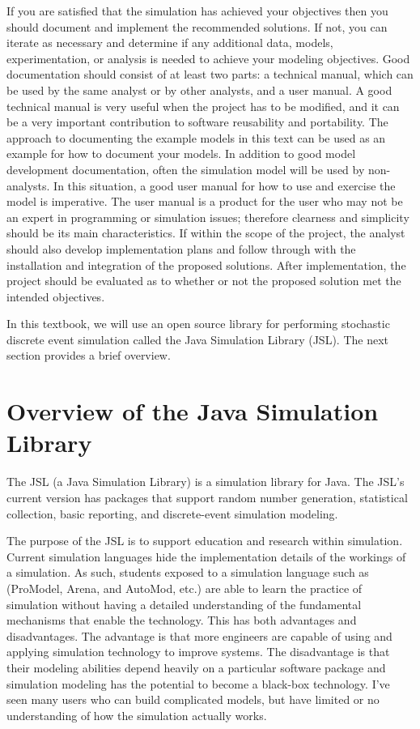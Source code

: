\documentclass[
]{book}
\theoremstyle{definition}
\theoremstyle{definition}
\theoremstyle{definition}
\theoremstyle{definition}
\theoremstyle{remark}
\begin{document}
If you are satisfied that the simulation has achieved your objectives
then you should document and implement the recommended solutions. If
not, you can iterate as necessary and determine if any additional data,
models, experimentation, or analysis is needed to achieve your modeling
objectives. Good documentation should consist of at least two parts: a
technical manual, which can be used by the same analyst or by other
analysts, and a user manual. A good technical manual is very useful when
the project has to be modified, and it can be a very important
contribution to software reusability and portability. The approach to
documenting the example models in this text can be used as an example
for how to document your models. In addition to good model development
documentation, often the simulation model will be used by non-analysts.
In this situation, a good user manual for how to use and exercise the
model is imperative. The user manual is a product for the user who may
not be an expert in programming or simulation issues; therefore
clearness and simplicity should be its main characteristics. If within
the scope of the project, the analyst should also develop implementation
plans and follow through with the installation and integration of the
proposed solutions. After implementation, the project should be
evaluated as to whether or not the proposed solution met the intended
objectives.

In this textbook, we will use an open source library for performing stochastic discrete event simulation called the Java Simulation Library (JSL). The next section provides a brief overview.

\hypertarget{overview-of-the-java-simulation-library}{%
\section{Overview of the Java Simulation Library}\label{overview-of-the-java-simulation-library}}

The JSL (a Java Simulation Library) is a simulation library for Java. The JSL's current version has packages that support random number generation, statistical collection, basic reporting, and discrete-event simulation modeling.

The purpose of the JSL is to support education and research within simulation. Current simulation languages hide the implementation details of the workings of a simulation. As such, students exposed to a simulation language such as (ProModel, Arena, and AutoMod, etc.) are able to learn the practice of simulation without having a detailed understanding of the fundamental mechanisms that enable the technology. This has both advantages and disadvantages. The advantage is that more engineers are capable of using and applying simulation technology to improve systems. The disadvantage is that their modeling abilities depend heavily on a particular software package and simulation modeling has the potential to become a black-box technology. I've seen many users who can build complicated models, but have limited or no understanding of how the simulation actually works.
\end{document}
